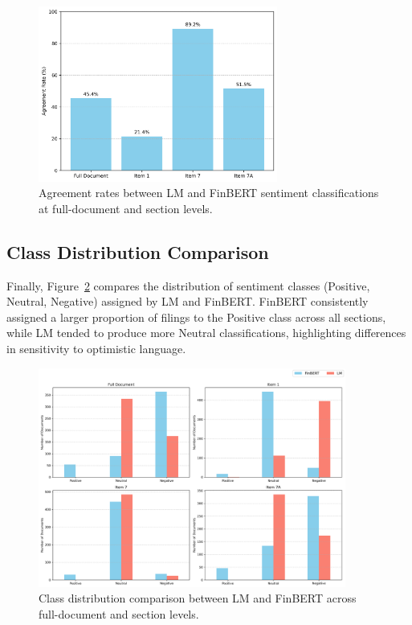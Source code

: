 \documentclass[12pt]{article}
\begin{document}
\begin{figure}[H]
\centering
\includegraphics[width=0.7\textwidth]{figures/agreement_bar_chart.png}
\caption{Agreement rates between LM and FinBERT sentiment classifications at full-document and section levels.}
\label{fig:agreement_bar}
\end{figure}

\subsection{Class Distribution Comparison}

Finally, Figure~\ref{fig:class_dist_all} compares the distribution of sentiment classes (Positive, Neutral, Negative) assigned by LM and FinBERT. FinBERT consistently assigned a larger proportion of filings to the Positive class across all sections, while LM tended to produce more Neutral classifications, highlighting differences in sensitivity to optimistic language.

\begin{figure}[H]
\centering
\includegraphics[width=0.9\textwidth]{figures/class_distribution_all_sections.png}
\caption{Class distribution comparison between LM and FinBERT across full-document and section levels.}
\label{fig:class_dist_all}
\end{figure}
\end{document}
